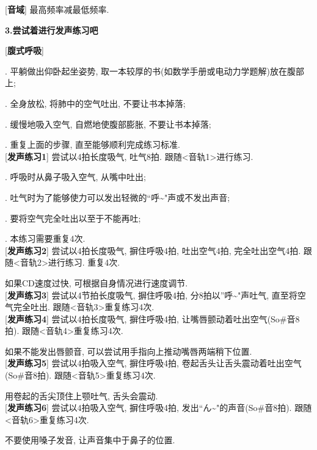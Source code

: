 [\textbf{音域}] 最高频率减最低频率.

\clearpage

\begin{center}
 \textbf{3.尝试着进行发声练习吧}
\end{center}

[\textbf{腹式呼吸}]\par
{}. 平躺做出仰卧起坐姿势, 取一本较厚的书(如数学手册或电动力学题解)放在腹部上;\par
{}. 全身放松, 将肺中的空气吐出, 不要让书本掉落;\par
{}. 缓慢地吸入空气, 自燃地使腹部膨胀, 不要让书本掉落;\par
{}. 重复上面的步骤, 直至能够顺利完成练习标准.\\

[\textbf{发声练习1}] 尝试以4拍长度吸气, 吐气8拍. 跟随<音轨1>进行练习.\par
{}. 呼吸时从鼻子吸入空气, 从嘴中吐出;\par
{}. 吐气时为了能够使力可以发出轻微的``呼\textasciitilde"声或不发出声音;\par
{}. 要将空气完全吐出以至于不能再吐;\par
{}. 本练习需要重复4次.\\

[\textbf{发声练习2}] 尝试以4拍长度吸气, 摒住呼吸4拍, 吐出空气4拍, 完全吐出空气4拍. 跟随<音轨2>进行练习. 重复4次.\par
\qquad 如果CD速度过快, 可根据自身情况进行速度调节.\\

[\textbf{发声练习3}] 尝试以4节拍长度吸气, 摒住呼吸4拍, 分8拍以''呼\textasciitilde"声吐气, 直至将空气完全吐出. 跟随<音轨3>重复练习4次.\\

[\textbf{发声练习4}] 尝试以4拍长度吸气, 摒住呼吸4拍, 让嘴唇颤动着吐出空气(So\#音8拍). 跟随<音轨4>重复练习4次.\par
\qquad 如果不能发出唇颤音, 可以尝试用手指向上推动嘴唇两端稍下位置.\\

[\textbf{发声练习5}] 尝试以4拍吸入空气, 摒住呼吸4拍, 卷起舌头让舌头震动着吐出空气(So\#音8拍). 跟随<音轨5>重复练习4次.\par
\qquad 用卷起的舌尖顶住上颚吐气, 舌头会震动.\\

[\textbf{发声练习6}] 尝试以4拍吸入空气, 摒住呼吸4拍, 发出``ん\textasciitilde"的声音(So\#音8拍). 跟随<音轨6>重复练习4次.\par
\qquad 不要使用嗓子发音, 让声音集中于鼻子的位置.\\

